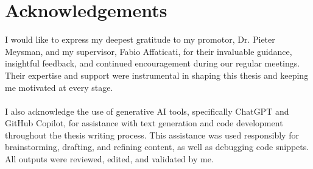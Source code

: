 \documentclass[12pt,a4paper]{report}
\begin{document}
{}
\chapter*{Acknowledgements}
I would like to express my deepest gratitude to my promotor, Dr. Pieter Meysman, and my supervisor, Fabio Affaticati, for their invaluable guidance, insightful feedback, and continued encouragement during our regular meetings. Their expertise and support were instrumental in shaping this thesis and keeping me motivated at every stage.\\
\\
I also acknowledge the use of generative AI tools, specifically ChatGPT and GitHub Copilot, for assistance with text generation and code development throughout the thesis writing process. This assistance was used responsibly for brainstorming, drafting, and refining content, as well as debugging code snippets. All outputs were reviewed, edited, and validated by me.

{}
\end{document}
